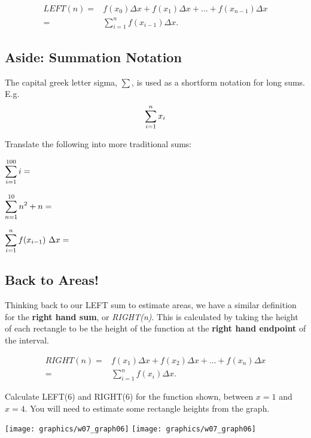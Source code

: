 \begin{align*}
  LEFT(n) = & f(x_{0}) \Delta x+ 
 f(x_{1}) \Delta x + \ldots + 
 f(x_{n-1}) \Delta x 
\\  = & \displaystyle\sum_{i=1}^{n} f(x_{i-1})\Delta x.
\end{align*}

\newpage

\subsection*{Aside: Summation Notation}

The capital greek letter sigma, $\sum$, is used as a shortform notation for long sums.
E.g.
$$\displaystyle \sum_{i=1}^n x_i$$

\newpage
\problem 
Translate the following into more traditional sums:

$\displaystyle \sum_{i=1}^{100} i= $ \vfill 

$\displaystyle \sum_{n=1}^{10} n^2 + n= $  \vfill

$\displaystyle \sum_{i=1}^{n}  f(x_{i-1}) ~\Delta x= $
\vfill

\newpage
{} 
\subsection*{Back to Areas!} 

Thinking back to our LEFT sum to estimate areas, we have a similar
definition for the {\bf right hand sum}, or {\em RIGHT(n)}. This is
calculated by taking the height of each rectangle to be the height of
the function at the {\bf right hand endpoint} of the interval.

\begin{align*}
RIGHT(n) = & f(x_{1}) \Delta x+ 
f(x_{2}) \Delta x + \ldots + 
 f(x_{n}) \Delta x \\ 
= &  \displaystyle\sum_{i=1}^{n} f(x_{i})\Delta x.
\end{align*}

\bigskip

\newpage 

{Calculate LEFT(6) and RIGHT(6) for the function shown,
  between $x=1$ and $x=4$.  You will need to estimate some rectangle
  heights from the graph.}

\texttt{[image: graphics/w07\_graph06]}
\hfill \texttt{[image: graphics/w07\_graph06]}
\newpage

%
%
%
%

